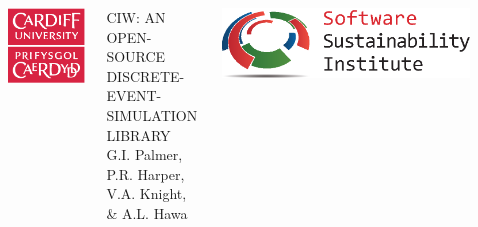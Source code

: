 \documentclass[usenames,dvipsnames,t]{beamer}
\begin{document}
\begin{columns}
  \begin{column}{0.015\linewidth}
  \end{column}
  \begin{column}{0.11\linewidth}
    \begin{center}
      \vspace{2mm}
      \includegraphics[width=\textwidth]{../cflogo}
    \end{center}
  \end{column}
  \begin{column}{0.575\linewidth}
    \begin{center}
      \vspace{3mm}
      \textcolor{textgrey}{\huge{CIW: AN OPEN-SOURCE DISCRETE-\\[5mm]EVENT-SIMULATION LIBRARY}}\\[10mm]
      \textcolor{textorange}{\LARGE{G.I. Palmer, P.R. Harper, V.A. Knight, \& A.L. Hawa}}
      \vspace{5mm}
    \end{center}
  \end{column}
  \begin{column}{0.3\linewidth}
    \begin{center}
      \vspace{10mm}
      \includegraphics[width=\textwidth]{../SSI_Logo}
    \end{center}
  \end{column}
  \begin{column}{0.015\linewidth}
  \end{column}
\end{columns}
\end{document}
